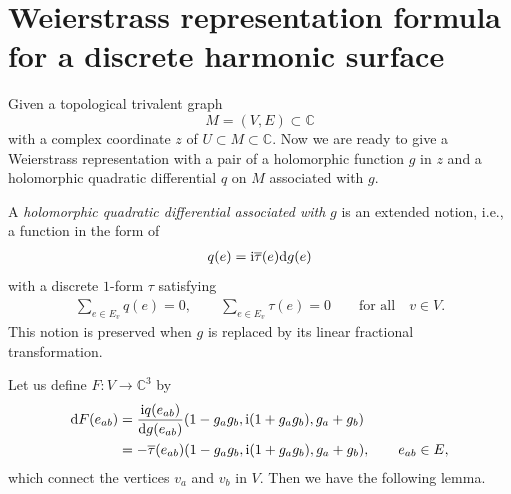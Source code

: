 \documentclass[10pt,a4paper]{amsart}
\newcommand{\C}{\mathbb{C}}
\newcommand{\ii}{{\mathrm{i}}}
\newcommand{\1}{{\bf 1}}
\numberwithin{equation}{section}
\begin{document}
\section[Weierstrass representation formula for a discrete harmonic surface]{Weierstrass representation formula\\ for a discrete harmonic surface}

Given a topological trivalent graph \[M=(V,E) \subset \C\]
 with a complex coordinate $z$ of $U \subset M \subset \C$.
Now we are ready to give a Weierstrass representation with a pair of a holomorphic function $g$ in $z$
and a holomorphic quadratic differential $q$ on $M$ associated with $g$.


A {\em holomorphic quadratic differential associated with} $g$ is an extended notion, i.e., a function in the form of
\begin{gather*}
 q(e)= \ii \overline{\tau}(e) {\rm d}g(e)
\end{gather*}
with a discrete $1$-form $\tau$ satisfying
\begin{gather*}
 \sum_{e \in E_v} q(e) =0,
 \qquad
 \sum_{e \in E_v} \tau(e) =0 \qquad \text{for all}\quad v \in V.
\end{gather*}
This notion is preserved when $g$ is replaced by its linear fractional transformation.

Let us define $F\colon V \to \C^3$ by
\begin{align*}
 {\rm d}F(e_{ab}) &= \frac{\ii q(e_{ab})}{{\rm d}g(e_{ab})}(1-g_ag_b, \ii(1+g_ag_b), g_a+g_b)\\
 &=-\overline{\tau}(e_{ab}) (1-g_ag_b, \ii(1+g_ag_b), g_a+g_b),\qquad e_{ab} \in E,
\end{align*}
which connect the vertices $v_a$ and $v_b$ in $V$. Then we have the following lemma.
\end{document}
